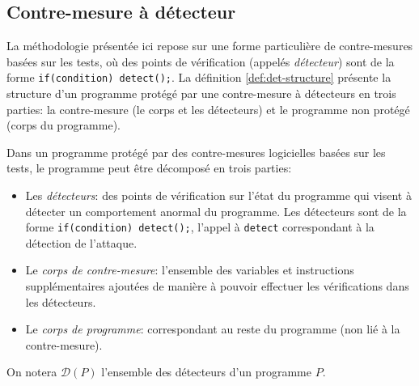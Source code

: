         \subsection{Contre-mesure à détecteur}
        \label{sec:cm-detectors}
        
            La méthodologie présentée ici repose sur une forme particulière de contre-mesures basées sur les tests, où des points de vérification (appelés \textit{détecteur}) sont de la forme \texttt{if(condition) detect();}.
            La définition \ref{def:det-structure} présente la structure d'un programme protégé par une contre-mesure à détecteurs en trois parties: la contre-mesure (le corps et les détecteurs) et le programme non protégé (corps du programme).
           
            \begin{defi}
            \label{def:det-structure}
            Dans un programme protégé par des contre-mesures logicielles basées sur les tests, le programme peut être décomposé en trois parties:
                \begin{itemize}
                    \item Les \textit{détecteurs}: des points de vérification sur l'état du programme qui visent à détecter un comportement anormal du programme. Les détecteurs sont de la forme \texttt{if(condition) detect();}, l'appel à \texttt{detect} correspondant à la détection de l'attaque.
                    \item Le \textit{corps de contre-mesure}: l'ensemble des variables et instructions supplémentaires ajoutées de manière à pouvoir effectuer les vérifications dans les détecteurs.
                    \item Le \textit{corps de programme}: correspondant au reste du programme (non lié à la contre-mesure).
                \end{itemize}
            \end{defi}
        
            \begin{defi}
                \label{def:detectors}
                On notera $\mathcal{D}(P)$ l'ensemble des détecteurs d'un programme $P$.
            \end{defi}
                
